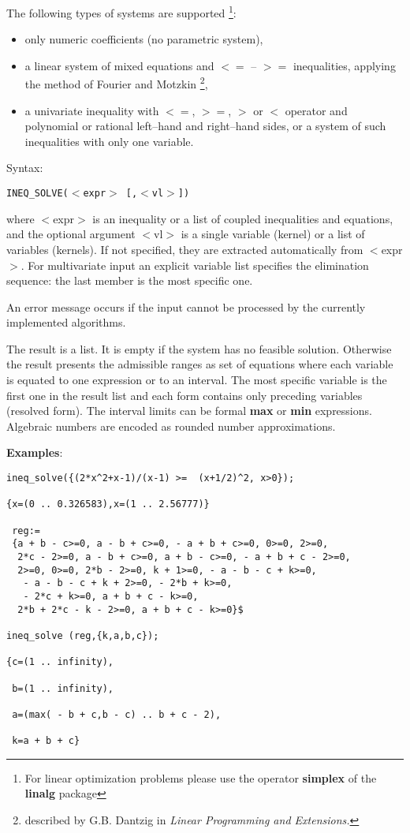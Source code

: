 
The following types of systems are supported%
\footnote{For linear optimization problems please use the operator
{\bf simplex} of the {\bf linalg} package}:
\begin{itemize}
\item only numeric coefficients (no parametric system),
\item a linear system of mixed equations and $<=$ -- $>=$ 
     inequalities, applying the method of Fourier and Motzkin
     \footnote{described by G.B. Dantzig in {\em Linear Programming 
      and Extensions.}},
\item a univariate inequality with $<=$, $>=$, $>$ or $<$ operator
     and polynomial or rational left--hand and right--hand sides,
     or a system of such inequalities with only one variable.
\end{itemize}

Syntax:
\begin{center}
{\tt INEQ\_SOLVE($<$expr$>$ [,$<$vl$>$])}
\end{center}
where $<$expr$>$ is an inequality or a list of coupled inequalities
and equations, and the optional argument $<$vl$>$ is a single
variable (kernel) or a list of variables (kernels). If not
specified, they are extracted automatically from $<$expr$>$.
For multivariate input an explicit variable list specifies the
elimination sequence: the last member is the most specific one.

An error message occurs if the input cannot be processed by the
currently implemented algorithms.

The result is a list. It is empty if the system has no feasible solution.
Otherwise the result presents the admissible ranges as set
of equations where each variable is equated to 
one expression or to an interval. 
The most specific variable is the first one in the result list and
each form contains only preceding variables (resolved form).
The interval limits can be formal {\bf max} or {\bf min} expressions.
Algebraic numbers are encoded as rounded number approximations.

\noindent
{\bf Examples}:

\begin{verbatim}
ineq_solve({(2*x^2+x-1)/(x-1) >=  (x+1/2)^2, x>0});

{x=(0 .. 0.326583),x=(1 .. 2.56777)}

 reg:=
 {a + b - c>=0, a - b + c>=0, - a + b + c>=0, 0>=0, 2>=0,
  2*c - 2>=0, a - b + c>=0, a + b - c>=0, - a + b + c - 2>=0,
  2>=0, 0>=0, 2*b - 2>=0, k + 1>=0, - a - b - c + k>=0,
   - a - b - c + k + 2>=0, - 2*b + k>=0,
   - 2*c + k>=0, a + b + c - k>=0,
  2*b + 2*c - k - 2>=0, a + b + c - k>=0}$

ineq_solve (reg,{k,a,b,c});

{c=(1 .. infinity),

 b=(1 .. infinity),

 a=(max( - b + c,b - c) .. b + c - 2),

 k=a + b + c}
\end{verbatim}


